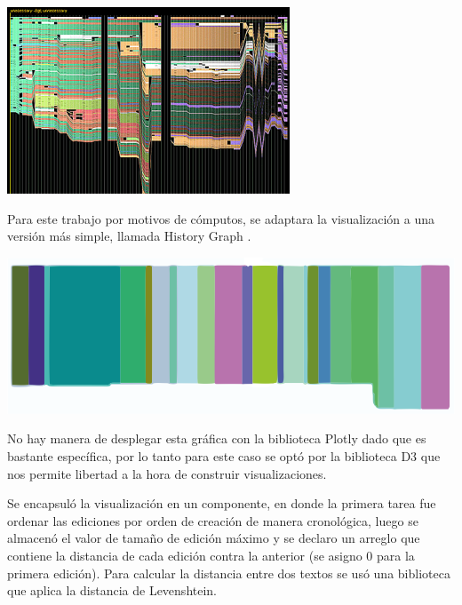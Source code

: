 \begin{enumerate}
  \begin{center}
      \bigbreak
      \includegraphics{images/marco_aplicativo/history_flow_original.png}
      \label{fig:history_flow_original}
      \bigbreak
  \end{center}
  
  Para este trabajo por motivos de cómputos, se adaptara la visualización a una versión más simple, llamada History Graph \cite{HistoryGraph}.
  
  \begin{center}
      \bigbreak
      \includegraphics{images/marco_aplicativo/history_graph.png}
      \label{fig:history_graph}
      \bigbreak
  \end{center}
  
  No hay manera de desplegar esta gráfica con la biblioteca Plotly dado que es bastante específica, por lo tanto para este caso se optó por la biblioteca D3 que nos permite libertad a la hora de construir visualizaciones.
  
  Se encapsuló la visualización en un componente, en donde la primera tarea fue ordenar las ediciones por orden de creación de manera cronológica, luego se almacenó el valor de tamaño de edición máximo y se declaro un arreglo que contiene la distancia de cada edición contra la anterior (se asigno 0 para la primera edición). Para calcular la distancia entre dos textos se usó una biblioteca que aplica la distancia de Levenshtein.
  

\end{enumerate}
